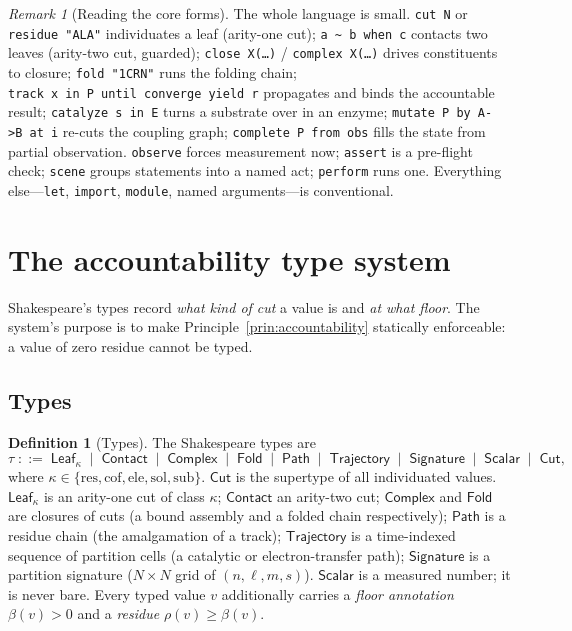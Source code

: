\documentclass[11pt,a4paper]{article}
\theoremstyle{thmstyle}
\theoremstyle{definition}
\newtheorem{definition}[theorem]{Definition}
\theoremstyle{remark}
\newtheorem{remark}[theorem]{Remark}
\newcommand{\flo}{\beta}
\newcommand{\res}{\rho}
\newcommand{\bnf}{\;::=\;}
\newcommand{\alt}{\;\mid\;}
\newcommand{\shk}[1]{\texttt{#1}}
\begin{document}
\begin{remark}[Reading the core forms]
\label{rem:core-forms}
The whole language is small. \shk{cut\ N} or \shk{residue\ "ALA"}
individuates a leaf (arity-one cut); \shk{a\ \~{}\ b\ when\ c} contacts two
leaves (arity-two cut, guarded); \shk{close\ X(\ldots)} /
\shk{complex\ X(\ldots)} drives constituents to closure;
\shk{fold\ "1CRN"} runs the folding chain; \shk{track\ x\ in\ P\ until\
converge\ yield\ r} propagates and binds the accountable result;
\shk{catalyze\ s\ in\ E} turns a substrate over in an enzyme;
\shk{mutate\ P\ by\ A->B\ at\ i} re-cuts the coupling graph;
\shk{complete\ P\ from\ obs} fills the state from partial observation.
\shk{observe} forces measurement now; \shk{assert} is a pre-flight check;
\shk{scene} groups statements into a named act; \shk{perform} runs one.
Everything else---\shk{let}, \shk{import}, \shk{module}, named
arguments---is conventional.
\end{remark}

\section{The accountability type system}
\label{sec:types}

Shakespeare's types record \emph{what kind of cut} a value is and \emph{at
what floor}. The system's purpose is to make
Principle~\ref{prin:accountability} statically enforceable: a value of
zero residue cannot be typed.

\subsection{Types}

\begin{definition}[Types]
\label{def:types}
The Shakespeare types are
\[
\tau \bnf \mathsf{Leaf}_\kappa \alt \mathsf{Contact} \alt \mathsf{Complex}
   \alt \mathsf{Fold} \alt \mathsf{Path} \alt \mathsf{Trajectory}
   \alt \mathsf{Signature} \alt \mathsf{Scalar} \alt \mathsf{Cut},
\]
where $\kappa\in\{\mathrm{res},\mathrm{cof},\mathrm{ele},\mathrm{sol},
\mathrm{sub}\}$. $\mathsf{Cut}$ is the supertype of all individuated
values. $\mathsf{Leaf}_\kappa$ is an arity-one cut of class $\kappa$;
$\mathsf{Contact}$ an arity-two cut; $\mathsf{Complex}$ and $\mathsf{Fold}$
are closures of cuts (a bound assembly and a folded chain respectively);
$\mathsf{Path}$ is a residue chain (the amalgamation of a track);
$\mathsf{Trajectory}$ is a time-indexed sequence of partition cells (a
catalytic or electron-transfer path); $\mathsf{Signature}$ is a partition
signature ($N\times N$ grid of $(n,\ell,m,s)$). $\mathsf{Scalar}$ is a
measured number; it is never bare. Every typed value $v$ additionally
carries a \emph{floor annotation} $\flo(v)>0$ and a \emph{residue}
$\res(v)\ge\flo(v)$.
\end{definition}
\end{document}
